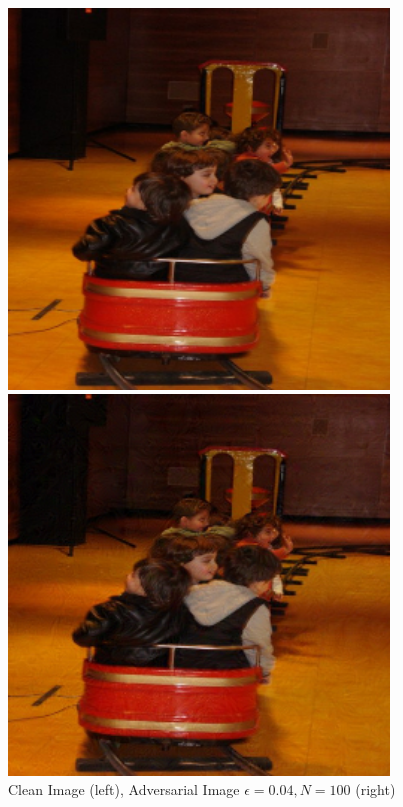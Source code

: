 \begin{figure}[h]
    \centering
    \begin{minipage}{0.45\textwidth}
        \centering
        \includegraphics[width=0.9\textwidth]{figures/distraction_adv_sample_0.png} %
    \end{minipage}\hfill
    \begin{minipage}{0.45\textwidth}
        \centering
        \includegraphics[width=0.9\textwidth]{figures/distraction_adv_sample_0.04.png} %
    \end{minipage}
    \caption{Clean Image (left), Adversarial Image $\epsilon=0.04, N=100$ (right)}
    \label{dist_adv_example_img}
\end{figure}

